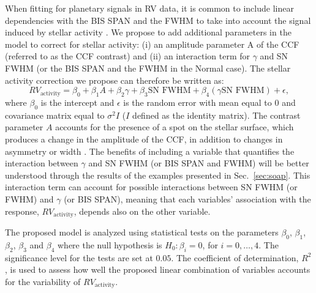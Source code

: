 \documentclass{aa}
\def\logrhk{$\log$(R$^{\prime}_{HK}$)}
\begin{document}
When fitting for planetary signals in RV data, it is common to include linear dependencies with the BIS SPAN and the FWHM to take into account the signal induced by stellar activity \citep[e.g.][]{Dumusque:2017aa,Feng:2017aa}.
We propose to add additional parameters in the model to correct for stellar activity: 
(i) an amplitude parameter A of the CCF (referred to as the CCF contrast) and (ii) an interaction term for $\gamma$ and SN FWHM (or the BIS SPAN and the FWHM in the Normal case). The stellar activity correction we propose can therefore be written as:
%
\begin{equation}
RV_{\text{activity}}= \beta_{0} + \beta_{1} A + \beta_{2} \gamma + \beta_{3} \text{SN FWHM} + \beta_{4} (\gamma  \text{SN FWHM})+\epsilon,
\label{eq:RV:correction}
\end{equation}
%
where $\beta_{0}$ is the intercept and $\epsilon$ is the random error with mean equal to $0$ and covariance matrix equal to $\sigma^{2}I$ ($I$ defined as the identity matrix). 
The contrast parameter $A$ accounts for the presence of a spot on the stellar surface, which produces a change in the amplitude of the CCF, in addition to changes in asymmetry or width \citep[see e.g. Fig. 2 in ][]{Dumusque-2014b}.
The benefits of including a variable that quantifies the interaction between $\gamma$ and SN FWHM (or BIS SPAN and FWHM) will be better understood through the results of the examples presented in Sec.~\ref{sec:soap}. 
This interaction term can account for possible interactions between SN FWHM (or FWHM) and $\gamma$ (or BIS SPAN), meaning that each  variables' association with the response, $RV_{\text{activity}}$, depends also on the other variable.

The proposed model is analyzed using statistical tests on the parameters $\beta_{0}$, $\beta_{1}$, $\beta_{2}$, $\beta_{3}$ and $\beta_{4}$ where the null hypothesis is $H_{0}: \beta_{i}=0$, for $i=0,\dots,4$. The significance level for the tests are set at $0.05$. The coefficient of determination, $R^2$, is used to assess how well the proposed linear combination of variables accounts for the variability of $RV_{\text{activity}}$. 
\end{document}
